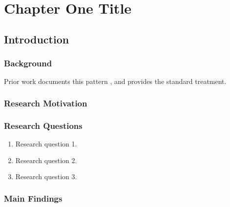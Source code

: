 \documentclass[../main.tex]{subfiles}
\begin{document}
\newpage
\onehalfspacing
\RaggedRight
\setcounter{chapter}{0}
\thesischapterstyle

\chapter{Chapter One Title}\label{chap1:short-label}

\section{Introduction}\label{sec:ch1-introduction}

\subsection{Background}
\lipsum[1]

Prior work documents this pattern \citep{placeholder-article}, and
\citet{placeholder-book} provides the standard treatment.

\subsection{Research Motivation}
\lipsum[2]

\subsection{Research Questions}
\begin{enumerate}
    \item Research question 1.
    \item Research question 2.
    \item Research question 3.
\end{enumerate}

\subsection{Main Findings}
\lipsum[3]
\end{document}
